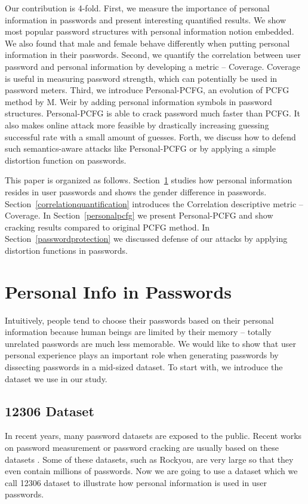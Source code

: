 \documentclass{sig-alternate}
\begin{document}
Our contribution is 4-fold. First, we measure the importance of personal information in passwords and present interesting quantified results. We show most popular password structures with personal information notion embedded. We also found that male and female behave differently when putting personal information in their passwords. Second, we quantify the correlation between user password and personal information by developing a metric -- Coverage. Coverage is useful in measuring password strength, which can potentially be used in password meters. Third, we introduce Personal-PCFG, an evolution of PCFG method by M. Weir\cite{weir2009password} by adding personal information symbols in password structures. Personal-PCFG is able to crack password much faster than PCFG. It also makes online attack more feasible by drastically increasing guessing successful rate with a small amount of guesses. Forth, we discuss how to defend such semantics-aware attacks like Personal-PCFG or \cite{veras2014semantic} by applying a simple distortion function on passwords. 

This paper is organized as follows. Section~\ref{personalinfo} studies how personal information resides in user passwords and shows the gender difference in passwords. Section~\ref{correlationquantification} introduces the Correlation descriptive metric -- Coverage. In Section~\ref{personalpcfg} we present Personal-PCFG and show cracking results compared to original PCFG method. In Section~\ref{passwordprotection} we discussed defense of our attacks by applying distortion functions in passwords.

\section{Personal Info in Passwords}
\label{personalinfo}
Intuitively, people tend to choose their passwords based on their personal information because human beings are limited by their memory -- totally unrelated passwords are much less memorable. We would like to show that user personal experience plays an important role when generating passwords by dissecting passwords in a mid-sized dataset. To start with, we introduce the dataset we use in our study. 

\subsection{12306 Dataset}
In recent years, many password datasets are exposed to the public. Recent works on password measurement or password cracking are usually based on these datasets \cite{bonneau2012science}\cite{li2014large}. Some of these datasets, such as Rockyou, are very large so that they even contain millions of passwords. Now we are going to use a dataset which we call 12306 dataset to illustrate how personal information is used in user passwords.
\end{document}
